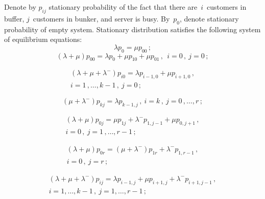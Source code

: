 \begin{multicols}{2}
Denote by $p_{ij}$ stationary probability of the fact that
there are~$i$~customers in buffer, $j$~customers in bunker,
and server is busy. By~$p_0$, denote stationary probability of empty system.
Stationary distribution satisfies the following system of equilibrium equations:
\begin{equation}    
\lambda p_0 = \mu p_{00}\,;
\label{eq31}
\end{equation}
\begin{equation}    
(\lambda+\mu)p_{00}=\lambda p_0 + \mu p_{10} + \mu p_{01}\,,\ \ i=0\,, \ j=0\,;
\label{eq32}
\end{equation}

\vspace*{-12pt}

\noindent
\begin{multline}
\left(\lambda+\mu+\lambda^-\right)
p_{i0}=\lambda p_{i-1,0} + \mu p_{i+1,0}\,, \\ 
i=1\,, \dots, k-1\,, \ j=0\,;
\label{eq33}
\end{multline}

\vspace*{-6pt}

\noindent
\begin{equation}
\left(\mu+\lambda^-\right)p_{kj}=\lambda p_{k-1,j}\,,\
i=k\,, \ j=0\,, \dots, r\,;
\label{eq34}
\end{equation}

\vspace*{-12pt}

\noindent
\begin{multline}
\left(\lambda+\mu\right) p_{0j}=\mu p_{1j} + \lambda^- p_{1,j-1} + 
\mu p_{0,j+1}\,,\\ 
i=0\,, \ j=1\,, \dots , r-1\,;
\label{eq35}
\end{multline}

\vspace*{-12pt}

\noindent
\begin{multline}
\left(\lambda+\mu\right) p_{0r}=(\mu + \lambda^- ) p_{1r}+ \lambda^- p_{1,r-1}\,,\\
i=0\,, \ j=r\,;
\label{eq36}
\end{multline}


\noindent
\begin{multline}
\left(\lambda+\mu+\lambda^-\right)p_{ij}=\lambda p_{i-1,j} + \mu p_{i+1,j} +
 \lambda^- p_{i+1,j-1}\,,\\  
 i=1,\dots , k-1\,, \ j=1,\dots ,r-1\,;
\label{eq37}
\end{multline}


\end{multicols}
